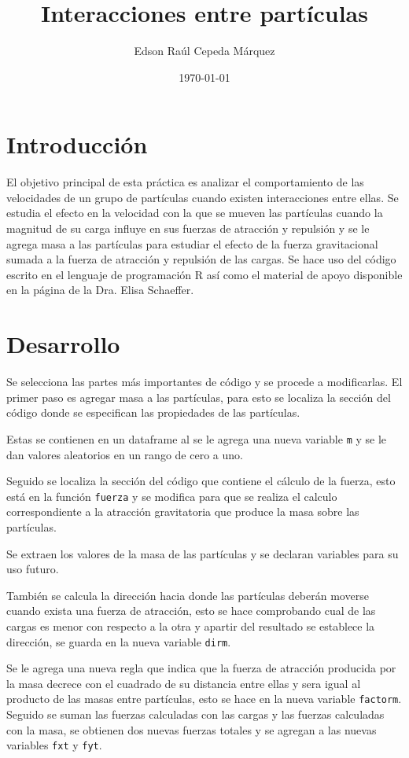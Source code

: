 \documentclass{article}
\author{Edson Raúl Cepeda Márquez}
\title{Interacciones entre partículas}
\date{\today}
\begin{document}
\maketitle

\section{Introducción}
El objetivo principal de esta práctica es analizar el comportamiento de las velocidades de un grupo de partículas cuando existen interacciones entre ellas.
Se estudia el efecto en la velocidad con la que se mueven las partículas cuando la magnitud de su carga influye en sus fuerzas de atracción y repulsión y se le agrega masa a las partículas para estudiar el efecto de la fuerza gravitacional sumada a la fuerza de atracción y repulsión de las cargas.
Se hace uso del código escrito en el lenguaje de programación R \cite{r} así como el material de apoyo disponible en la página \cite{satu} de la Dra. Elisa Schaeffer.

\section{Desarrollo}
Se selecciona las partes más importantes de código y se procede a modificarlas.
El primer paso es agregar masa a las partículas, para esto se localiza la sección del código donde se especifican las propiedades de las partículas.


Estas se contienen en un dataframe al se le agrega una nueva variable \texttt{m} y se le dan valores aleatorios en un rango de cero a uno.

Seguido se localiza la sección del código que contiene el cálculo de la fuerza, esto está en la función \texttt{fuerza} y se modifica para que se realiza el calculo correspondiente a la atracción gravitatoria que produce la masa sobre las partículas.


Se extraen los valores de la masa de las partículas y se declaran variables para su uso futuro.


También se calcula la dirección hacia donde las partículas deberán moverse cuando exista una fuerza de atracción, esto se hace comprobando cual de las cargas es menor con respecto a la otra y apartir del resultado se establece la dirección, se guarda en la nueva variable \texttt{dirm}.


Se le agrega una nueva regla que indica que la fuerza de atracción producida por la masa decrece con el cuadrado de su distancia entre ellas y sera igual al producto de las masas entre partículas, esto se hace en la nueva variable \texttt{factorm}.
Seguido se suman las fuerzas calculadas con las cargas y las fuerzas calculadas con la masa, se obtienen dos nuevas fuerzas totales y se agregan a las nuevas variables \texttt{fxt} y \texttt{fyt}.
\end{document}
